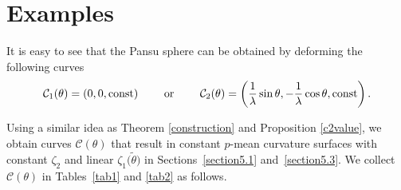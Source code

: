 \documentclass[pdftex]{sigma}
\numberwithin{equation}{section}
\begin{document}
\section{Examples}\label{examples}

It is easy to see that the Pansu sphere can be obtained by deforming the following curves
\[
\mathcal{C}_1(\theta)=(0,0,\text{\rm const}) \qquad\text{ or }\qquad \mathcal{C}_2(\theta)=\left(\frac{1
}{\lambda}\sin{\theta},-\frac{1}{\lambda}\cos{\theta},\text{\rm const}\right).
\]

Using a similar idea as Theorem \ref{construction} and Proposition \ref{c2value}, we obtain curves $\mathcal{C}(\theta)$ that result in constant $p$-mean curvature surfaces with
constant $\zeta_2$ and linear $\zeta_1\bigl(\tilde \theta\bigr)$ in Sections~\ref{section5.1} and~\ref{section5.3}. We collect $\mathcal C(\theta)$ in Tables~\ref{tab1} and \ref{tab2} as follows.
\end{document}
